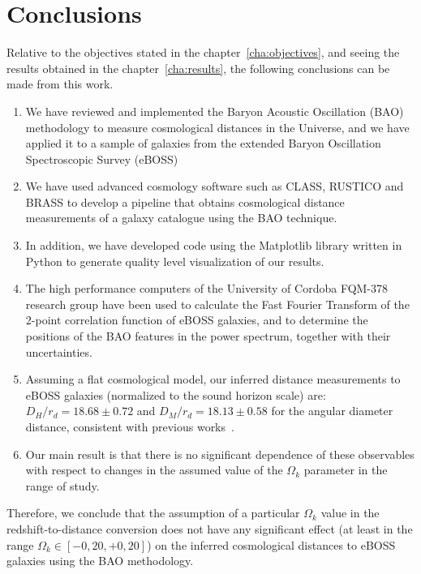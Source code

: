 \chapter*{Conclusions}

Relative to the objectives stated in the chapter~\ref{cha:objectives}, and seeing the results obtained in the chapter~\ref{cha:results}, the following conclusions can be made from this work.

\begin{enumerate}
	\item We have reviewed and implemented the Baryon Acoustic Oscillation (BAO) methodology to measure cosmological distances in the Universe, and we have applied it to a sample of galaxies from the extended Baryon Oscillation Spectroscopic Survey (eBOSS)
	\item We have used advanced cosmology software such as CLASS, RUSTICO and BRASS to develop a pipeline that obtains cosmological distance measurements of a galaxy catalogue using the BAO technique.
	\item In addition, we have developed code using the Matplotlib library written in Python to generate quality level visualization of our results.
	\item The high performance computers of the University of Cordoba FQM-378 research group have been used to calculate the Fast Fourier Transform of the 2-point correlation function of eBOSS galaxies, and to determine the positions of the BAO features in the power spectrum, together with their uncertainties.
	\item Assuming a flat cosmological model, our inferred distance measurements to eBOSS galaxies (normalized to the sound horizon scale) are: $D_H/r_d = 18.68 \pm 0.72$ and $D_M/r_d = 18.13 \pm 0.58$ for the angular diameter distance, consistent with previous works~\cite{hector}.
	\item Our main result is that there is no significant dependence of these observables with respect to changes in the assumed value of the $\Omega_k$ parameter in the range of study.
\end{enumerate}

Therefore, we conclude that the assumption of a particular $\Omega_k$ value in the redshift-to-distance conversion does not have any significant effect (at least in the range $\Omega_k \in [-0,20, +0,20]$) on the inferred cosmological distances to eBOSS galaxies using the BAO methodology.

